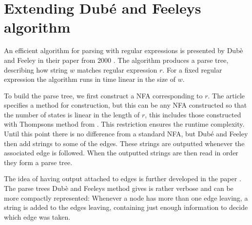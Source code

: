 \section{Extending Dub\'{e} and Feeleys algorithm}

An efficient algorithm for parsing with regular expressions is
presented by Dubè and Feeley in their paper from 2000
\cite{Dube2000}. The algorithm produces a parse tree, describing how
string $w$ matches regular expression $r$. For a fixed regular
expression the algorithm runs in time linear in the size of $w$. 

To build the parse tree, we first construct a NFA corresponding to
$r$. The article specifies a method for construction, but this can be
any NFA constructed so that the number of states is linear in the
length of $r$, this includes those constructed with Thompsons method
from \cite{Thompson1968}. This restriction ensures the runtime
complexity. Until this point there is no difference from a standard
NFA, but Dubé and Feeley then add strings to some of the edges. These
strings are outputted whenever the associated edge is followed. When
the outputted strings are then read in order they form a parse tree.









The idea of having output attached to edges is further developed in
the paper \cite{Henglein2010}. The parse trees Dubè and Feeleys method
gives is rather verbose and can be more compactly represented:
Whenever a node has more than one edge leaving, a string is added to
the edges leaving, containing just enough information to decide which
edge was taken.

